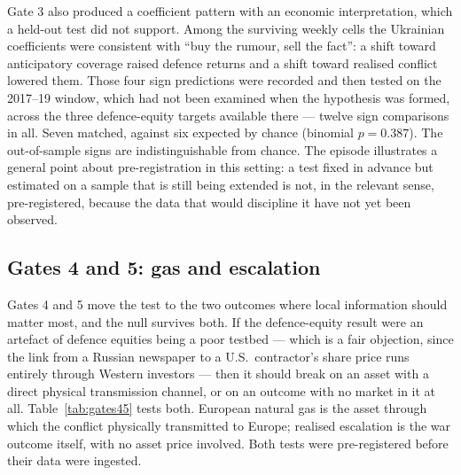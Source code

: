 \documentclass[12pt,a4paper]{article}
\begin{document}
Gate 3 also produced a coefficient pattern with an economic interpretation, which a held-out test did not support. Among the surviving weekly cells the Ukrainian coefficients were consistent with ``buy the rumour, sell the fact'': a shift toward anticipatory coverage raised defence returns and a shift toward realised conflict lowered them. Those four sign predictions were recorded and then tested on the 2017--19 window, which had not been examined when the hypothesis was formed, across the three defence-equity targets available there --- twelve sign comparisons in all. Seven matched, against six expected by chance (binomial $p = 0.387$). The out-of-sample signs are indistinguishable from chance. The episode illustrates a general point about pre-registration in this setting: a test fixed in advance but estimated on a sample that is still being extended is not, in the relevant sense, pre-registered, because the data that would discipline it have not yet been observed.

\subsection{Gates 4 and 5: gas and escalation}
\label{sec:gates45}

Gates 4 and 5 move the test to the two outcomes where local information should matter most, and the null survives both. If the defence-equity result were an artefact of defence equities being a poor testbed --- which is a fair objection, since the link from a Russian newspaper to a U.S.\ contractor's share price runs entirely through Western investors --- then it should break on an asset with a direct physical transmission channel, or on an outcome with no market in it at all. Table~\ref{tab:gates45} tests both. European natural gas is the asset through which the conflict physically transmitted to Europe; realised escalation is the war outcome itself, with no asset price involved. Both tests were pre-registered before their data were ingested.
\end{document}
